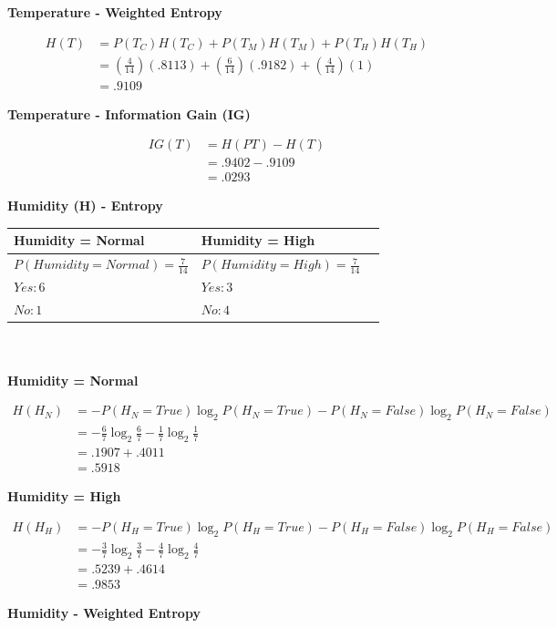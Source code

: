 \documentclass[11pt]{article}
\begin{document}
\begin{enumerate}
\textbf{Temperature - Weighted Entropy}

\[
\begin{aligned}
H(T)&= P(T_C)H(T_C)+P(T_M)H(T_M)+P(T_H)H(T_H)\\[5pt]
&= (\frac{4}{14})(.8113)+(\frac{6}{14})(.9182)+(\frac{4}{14})(1)\\[5pt]
&= .9109
\end{aligned}
\]

\textbf{Temperature - Information Gain (IG)}

\[
\begin{aligned}
IG(T)&= H(PT) - H(T)\\[5pt]
&= .9402 - .9109\\[5pt]
&= .0293
\end{aligned}
\]

\textbf{Humidity (H) - Entropy}

\begin{tabular}{l|l|l}
    \textbf{Humidity = Normal} & \textbf{Humidity = High} \\
    \hline
    $P(Humidity = Normal) = \frac{7}{14}$ & $P(Humidity = High) = \frac{7}{14}$ \\
    $Yes: 6$ & $Yes: 3$ \\
    $No: 1$ & $No: 4$\\
\end{tabular}\\\\

\textbf{Humidity = Normal}

\[
\begin{aligned}
H(H_N)&= -P(H_N=True) \log_2 P(H_N=True)-P(H_N=False) \log_2 P(H_N=False)\\[5pt]
&= -\frac{6}{7}\log_2\frac{6}{7}-\frac{1}{7}\log_2\frac{1}{7}\\[5pt]
&= .1907 + .4011\\[5pt]
&= .5918
\end{aligned}
\]

\textbf{Humidity = High}

\[
\begin{aligned}
H(H_H)&= -P(H_H=True) \log_2 P(H_H=True)-P(H_H=False) \log_2 P(H_H=False)\\[5pt]
&= -\frac{3}{7}\log_2\frac{3}{7}-\frac{4}{7}\log_2\frac{4}{7}\\[5pt]
&= .5239 + .4614\\[5pt]
&= .9853
\end{aligned}
\]

\textbf{Humidity - Weighted Entropy}


\end{enumerate}
\end{document}
